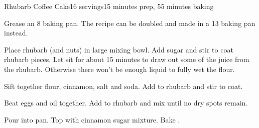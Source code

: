 \documentclass[../Cookbook.tex]{subfiles}
\begin{document}
\begin{recipe}{Rhubarb Coffee Cake}{16 servings}{15 minutes prep, 55 minutes baking}

	 Grease an 8 baking pan. The recipe can be doubled and made in a 13 baking pan instead.

	Place rhubarb (and nuts) in large mixing bowl.  Add sugar and stir to coat rhubarb pieces.
	Let sit for about 15 minutes to draw out some of the juice from the rhubarb. Otherwise there won't be enough liquid to fully wet the flour.

	Sift together flour, cinnamon, salt and soda.  Add to rhubarb and stir to coat.

	Beat eggs and oil together.  Add to rhubarb and mix until no dry spots remain.

	Pour into pan. Top with cinnamon sugar mixture. Bake .
\end{recipe}
\end{document}
